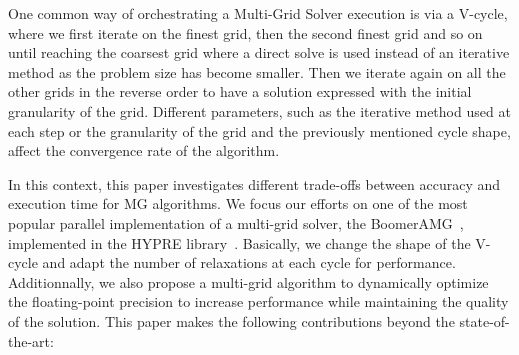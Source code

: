 One common way of orchestrating a Multi-Grid Solver execution is via a V-cycle,
where we first iterate on the finest grid, then the second finest grid and so
on until reaching the coarsest grid where a direct solve is used instead of an
iterative method as the problem size has become smaller.  Then we iterate again
on all the other grids in the reverse order to have a solution expressed with
the initial granularity of the grid.  Different parameters, such as the iterative
method used at each step or the granularity of the grid and the previously
mentioned cycle shape, affect the convergence rate of the algorithm.


In this context, this paper investigates different trade-offs between accuracy
and execution time for MG algorithms. We focus our efforts on
one of the most popular parallel implementation of a multi-grid solver, the
BoomerAMG~\cite{boomerAMG}, implemented in the HYPRE
library~\cite{Falgout2002}. Basically, we change the shape of the V-cycle and adapt the number of relaxations at each cycle for performance. Additionnally,
we also propose a multi-grid algorithm to dynamically optimize the floating-point precision to increase performance while maintaining the quality of the solution.
This paper makes the following contributions
beyond the state-of-the-art:


